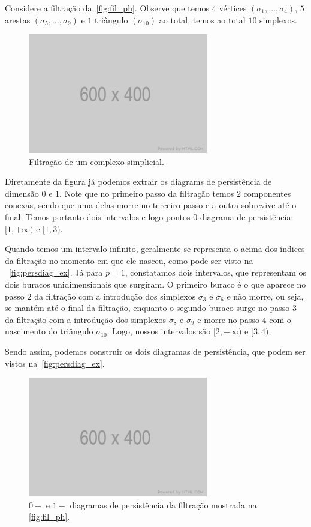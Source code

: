 Considere a filtração da~\autoref{fig:fil_ph}. Observe que temos $4$ vértices
$(\sigma_1,\dots,\sigma_4)$, $5$ arestas $(\sigma_5,\dots,\sigma_9)$
e $1$ triângulo $(\sigma_{10})$ ao total, temos ao total $10$ simplexos.
\begin{figure}[htb]
  \centering
  \includegraphics[width=0.7\textwidth]{images/placeholder.png}
  \caption{Filtração de um complexo simplicial.}
  \label{fig:fil_ph}
  \fautor
\end{figure}
Diretamente da figura já podemos extrair os diagrams de persistência de dimensão
$0$ e $1$. Note que no primeiro passo da filtração temos $2$ componentes conexas,
sendo que uma delas morre no terceiro passo e a outra sobrevive até o final.
Temos portanto dois intervalos e logo pontos $0$-diagrama de persistência:
$[1,+\infty)$ e $[1,3)$.

Quando temos um intervalo infinito, geralmente se representa o acima dos
índices da filtração no momento em que ele nasceu, como pode ser visto na
~\autoref{fig:persdiag_ex}. Já para $p=1$, constatamos dois intervalos,
que representam os dois buracos unidimensionais que surgiram. O primeiro buraco
é o que aparece no passo $2$ da filtração com a introdução dos simplexos
$\sigma_3$ e $\sigma_6$ e não morre, ou seja, se mantém até o final da filtração,
enquanto o segundo buraco surge no passo $3$ da filtração com a introdução
dos simplexos $\sigma_8$ e $\sigma_9$ e morre no passo $4$ com o nascimento
do triângulo $\sigma_{10}$. Logo, nossos intervalos são $[2, +\infty)$ e $[3,4)$.

Sendo assim, podemos construir os dois diagramas de persistência, que podem
ser vistos na~\autoref{fig:persdiag_ex}.
\begin{figure}[htb]
  \centering
  \includegraphics[width=0.7\textwidth]{images/placeholder.png}
  \caption{$0-$ e $1-$ diagramas de persistência da filtração mostrada na
  \autoref{fig:fil_ph}.}
  \label{fig:persdiag_ex}
  \fautor
\end{figure}

